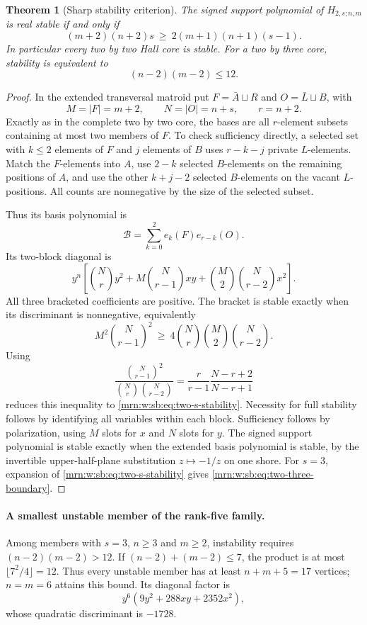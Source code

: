 \documentclass[11pt,a4paper]{article}
\newtheorem{theorem}{Theorem}[section]
\theoremstyle{remark}\newtheorem{remark}[theorem]{Remark}
\begin{document}
\begin{theorem}[Sharp stability criterion]\label{mrn:w:sb:thm:two-s-boundary}
The signed support polynomial of $H_{2,s;n,m}$ is real stable if and only if
\begin{equation}\label{mrn:w:sb:eq:two-s-stability}
 (m+2)(n+2)s\ \ge\ 2(m+1)(n+1)(s-1).
\end{equation}
In particular every two by two Hall core is stable. For a two by three core, stability is equivalent to
\begin{equation}\label{mrn:w:sb:eq:two-three-boundary}
 (n-2)(m-2)\le12.
\end{equation}
\end{theorem}
\begin{proof}
In the extended transversal matroid put $F=\bar A\sqcup R$ and $O=\bar L\sqcup B$, with
\[
 M=|F|=m+2,\qquad N=|O|=n+s,\qquad r=n+2.
\]
Exactly as in the complete two by two core, the bases are all $r$-element subsets containing at most two members of $F$. To check sufficiency directly, a selected set with $k\le2$ elements of $F$ and $j$ elements of $B$ uses $r-k-j$ private $L$-elements. Match the $F$-elements into $A$, use $2-k$ selected $B$-elements on the remaining positions of $A$, and use the other $k+j-2$ selected $B$-elements on the vacant $L$-positions. All counts are nonnegative by the size of the selected subset.

Thus its basis polynomial is
\[
 \mathcal B=\sum_{k=0}^2e_k(F)e_{r-k}(O).
\]
Its two-block diagonal is
\[
 y^n\left[
 \binom Nr y^2+M\binom N{r-1}xy+
 \binom M2\binom N{r-2}x^2
 \right].
\]
All three bracketed coefficients are positive. The bracket is stable exactly when its discriminant is nonnegative, equivalently
\[
 M^2\binom N{r-1}^{\!2}
 \ \ge\ 4\binom Nr\binom M2\binom N{r-2}.
\]
Using
\[
 \frac{\binom N{r-1}^{\!2}}{\binom Nr\binom N{r-2}}
 =\frac r{r-1}\frac{N-r+2}{N-r+1}
\]
reduces this inequality to \eqref{mrn:w:sb:eq:two-s-stability}. Necessity for full stability follows by identifying all variables within each block. Sufficiency follows by polarization, using $M$ slots for $x$ and $N$ slots for $y$. The signed support polynomial is stable exactly when the extended basis polynomial is stable, by the invertible upper-half-plane substitution $z\mapsto-1/z$ on one shore. For $s=3$, expansion of \eqref{mrn:w:sb:eq:two-s-stability} gives \eqref{mrn:w:sb:eq:two-three-boundary}.
\end{proof}

\paragraph{A smallest unstable member of the rank-five family.}
Among members with $s=3$, $n\ge3$ and $m\ge2$, instability requires $(n-2)(m-2)>12$. If $(n-2)+(m-2)\le7$, the product is at most $\lfloor 7^2/4\rfloor=12$. Thus every unstable member has at least $n+m+5=17$ vertices; $n=m=6$ attains this bound. Its diagonal factor is
\[
 y^6(9y^2+288xy+2352x^2),
\]
whose quadratic discriminant is $-1728$.
\end{document}
